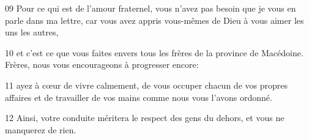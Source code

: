 
09 Pour ce qui est de l’amour fraternel, vous n’avez pas besoin que je vous en parle dans ma lettre, car vous avez appris vous-mêmes de Dieu à vous aimer les uns les autres,

10 et c’est ce que vous faites envers tous les frères de la province de Macédoine. Frères, nous vous encourageons à progresser encore:

11 ayez à cœur de vivre calmement, de vous occuper chacun de vos propres affaires et de travailler de vos mains comme nous vous l’avons ordonné.

12 Ainsi, votre conduite méritera le respect des gens du dehors, et vous ne manquerez de rien.